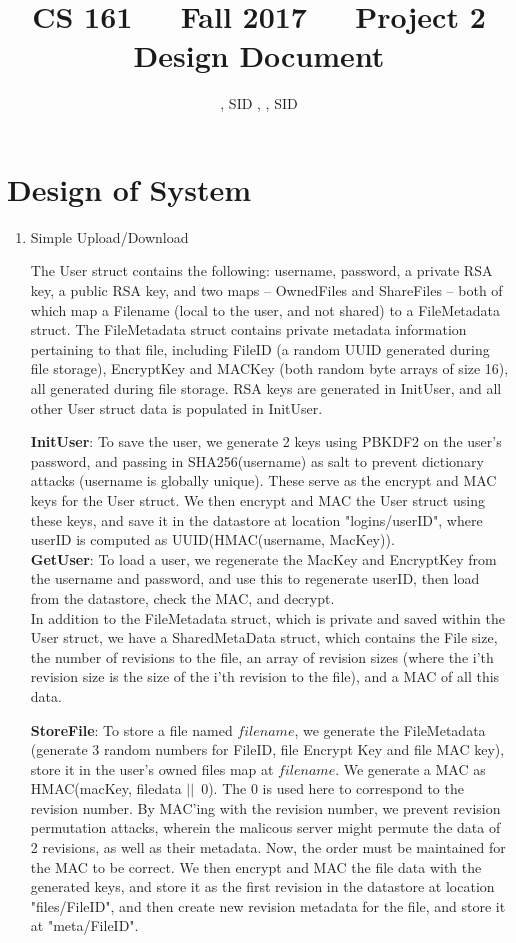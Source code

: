 \documentclass[11pt]{article}
\title{CS 161\ \ \ Fall 2017\ \ \ Project 2 Design Document}
\author{\NameA, SID \SIDA, \NameB, SID \SIDB}
\date{}
\begin{document}
\maketitle

\section{Design of System}
\begin{enumerate}
\item{Simple Upload/Download}

The User struct contains the following: username, password, a private RSA key, a public RSA key, and two maps -- OwnedFiles and ShareFiles -- both of which map a Filename (local to the user, and not shared) to a FileMetadata struct. The FileMetadata struct contains private metadata information pertaining to that file, including FileID (a random UUID generated during file storage), EncryptKey and MACKey (both random byte arrays of size 16), all generated during file storage. RSA keys are generated in InitUser, and all other User struct data is populated in InitUser.

\textbf{InitUser}: To save the user, we generate 2 keys using PBKDF2 on the user's password, and passing in SHA256(username) as salt to prevent dictionary attacks (username is globally unique). These serve as the encrypt and MAC keys for the User struct. We then encrypt and MAC the User struct using these keys, and save it in the datastore at location "logins/userID", where userID is computed as UUID(HMAC(username, MacKey)).\\

\textbf{GetUser}: To load a user, we regenerate the MacKey and EncryptKey from the username and password, and use this to regenerate userID, then load from the datastore, check the MAC, and decrypt.\\

In addition to the FileMetadata struct, which is private and saved within the User struct, we have a SharedMetaData struct, which contains the File size, the number of revisions to the file, an array of revision sizes (where the i'th revision size is the size of the i'th revision to the file), and a MAC of all this data.

\textbf{StoreFile}: To store a file named $filename$, we generate the FileMetadata (generate 3 random numbers for FileID, file Encrypt Key and file MAC key), store it in the user's owned files map at $filename$. We generate a MAC as HMAC(macKey, filedata $||$\ $0$). The $0$ is used here to correspond to the revision number. By MAC'ing with the revision number, we prevent revision permutation attacks, wherein the malicous server might permute the data of 2 revisions, as well as their metadata. Now, the order must be maintained for the MAC to be correct. We then encrypt and MAC the file data with the generated keys, and store it as the first revision in the datastore at location "files/FileID", and then create new revision metadata for the file, and store it at "meta/FileID".\\


\end{enumerate}
\end{document}

